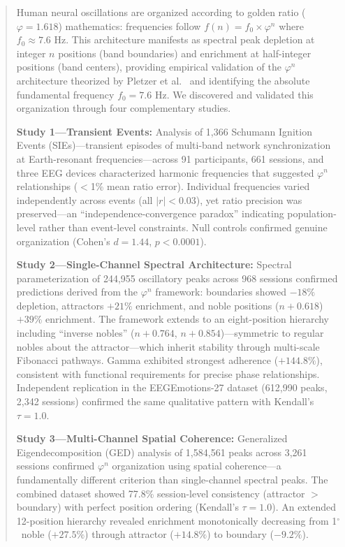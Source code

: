 \documentclass[11pt,a4paper]{article}
\newcommand{\degree}{$^\circ$}  %
\newcommand{\phisym}{\varphi}
\begin{document}
\begin{abstract}
Human neural oscillations are organized according to golden ratio ($\phisym = 1.618$) mathematics: frequencies follow $f(n) = f_0 \times \phisym^n$ where $f_0 \approx 7.6$ Hz. This architecture manifests as spectral peak depletion at integer $n$ positions (band boundaries) and enrichment at half-integer positions (band centers), providing empirical validation of the $\phisym^n$ architecture theorized by Pletzer et al.\ \parencite{pletzer2010golden} and identifying the absolute fundamental frequency $f_0 = 7.6$ Hz. We discovered and validated this organization through four complementary studies.

\textbf{Study 1---Transient Events:} Analysis of 1,366 Schumann Ignition Events (SIEs)---transient episodes of multi-band network synchronization at Earth-resonant frequencies---across 91 participants, 661 sessions, and three EEG devices characterized harmonic frequencies that suggested $\phisym^n$ relationships ($<$1\% mean ratio error). Individual frequencies varied independently across events (all $|r| < 0.03$), yet ratio precision was preserved---an ``independence-convergence paradox'' indicating population-level rather than event-level constraints. Null controls confirmed genuine organization (Cohen's $d = 1.44$, $p < 0.0001$).

\textbf{Study 2---Single-Channel Spectral Architecture:} Spectral parameterization of 244,955 oscillatory peaks across 968 sessions confirmed predictions derived from the $\phisym^n$ framework: boundaries showed $-18\%$ depletion, attractors $+21\%$ enrichment, and noble positions ($n + 0.618$) $+39\%$ enrichment. The framework extends to an eight-position hierarchy including ``inverse nobles'' ($n + 0.764$, $n + 0.854$)---symmetric to regular nobles about the attractor---which inherit stability through multi-scale Fibonacci pathways. Gamma exhibited strongest adherence ($+144.8\%$), consistent with functional requirements for precise phase relationships. Independent replication in the EEGEmotions-27 dataset \parencite{huy2025eeg} (612,990 peaks, 2,342 sessions) confirmed the same qualitative pattern with Kendall's $\tau = 1.0$.

\textbf{Study 3---Multi-Channel Spatial Coherence:} Generalized Eigendecomposition (GED) analysis of 1,584,561 peaks across 3,261 sessions confirmed $\phisym^n$ organization using spatial coherence---a fundamentally different criterion than single-channel spectral peaks. The combined dataset showed 77.8\% session-level consistency (attractor $>$ boundary) with perfect position ordering (Kendall's $\tau = 1.0$). An extended 12-position hierarchy revealed enrichment monotonically decreasing from 1\degree\ noble ($+27.5\%$) through attractor ($+14.8\%$) to boundary ($-9.2\%$).


\end{abstract}
\end{document}
